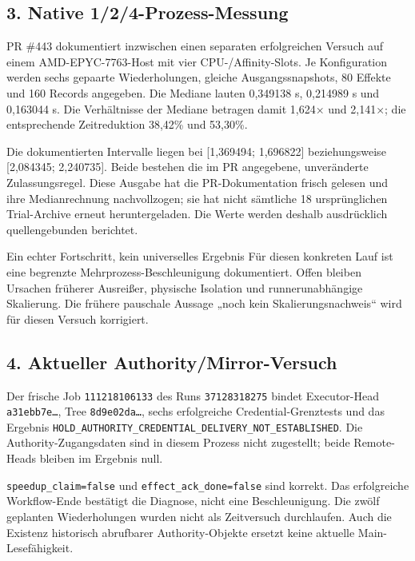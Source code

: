 \begin{cols}
\subsection*{3. Native 1/2/4-Prozess-Messung}
PR \#443 dokumentiert inzwischen einen separaten erfolgreichen Versuch auf einem AMD-EPYC-7763-Host mit vier CPU-/Affinity-Slots. Je Konfiguration werden sechs gepaarte Wiederholungen, gleiche Ausgangssnapshots, 80 Effekte und 160 Records angegeben. Die Mediane lauten 0,349138 s, 0,214989 s und 0,163044 s. Die Verhältnisse der Mediane betragen damit 1,624× und 2,141×; die entsprechende Zeitreduktion 38,42\% und 53,30\%. 

Die dokumentierten Intervalle liegen bei [1,369494; 1,696822] beziehungsweise [2,084345; 2,240735]. Beide bestehen die im PR angegebene, unveränderte Zulassungsregel. Diese Ausgabe hat die PR-Dokumentation frisch gelesen und ihre Medianrechnung nachvollzogen; sie hat nicht sämtliche 18 ursprünglichen Trial-Archive erneut heruntergeladen. Die Werte werden deshalb ausdrücklich quellengebunden berichtet.

\begin{boundary}{Ein echter Fortschritt, kein universelles Ergebnis}
Für diesen konkreten Lauf ist eine begrenzte Mehrprozess-Beschleunigung dokumentiert. Offen bleiben Ursachen früherer Ausreißer, physische Isolation und runnerunabhängige Skalierung. Die frühere pauschale Aussage „noch kein Skalierungsnachweis“ wird für diesen Versuch korrigiert. 
\end{boundary}

\subsection*{4. Aktueller Authority/Mirror-Versuch}
Der frische Job \texttt{111218106133} des Runs \texttt{37128318275} bindet Executor-Head \texttt{a31ebb7e…}, Tree \texttt{8d9e02da…}, sechs erfolgreiche Credential-Grenztests und das Ergebnis \texttt{HOLD\_AUTHORITY\_CREDENTIAL\_DELIVERY\_NOT\_ESTABLISHED}. Die Authority-Zugangsdaten sind in diesem Prozess nicht zugestellt; beide Remote-Heads bleiben im Ergebnis null. 

\texttt{speedup\_claim=false} und \texttt{effect\_ack\_done=false} sind korrekt. Das erfolgreiche Workflow-Ende bestätigt die Diagnose, nicht eine Beschleunigung. Die zwölf geplanten Wiederholungen wurden nicht als Zeitversuch durchlaufen. Auch die Existenz historisch abrufbarer Authority-Objekte ersetzt keine aktuelle Main-Lesefähigkeit.
\end{cols}

